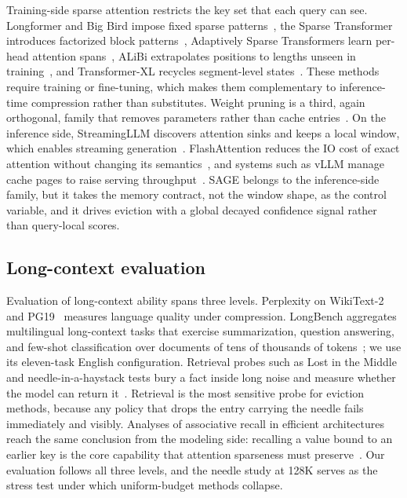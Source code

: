 Training-side sparse attention restricts the key set that each query
can see. Longformer and Big Bird impose fixed sparse
patterns~\cite{beltagy2020longformer,zaheer2020big}, the Sparse
Transformer introduces factorized block patterns~\cite{child2019generating},
Adaptively Sparse Transformers learn per-head attention
spans~\cite{correia2019adaptively}, ALiBi extrapolates positions to
lengths unseen in training~\cite{press2021alibi}, and Transformer-XL
recycles segment-level states~\cite{dai2019transformer}. These methods
require training or fine-tuning, which makes them complementary to
inference-time compression rather than substitutes. Weight pruning is
a third, again orthogonal, family that removes parameters rather than
cache entries~\cite{frantar2023sparsegpt}. On the inference
side, StreamingLLM discovers attention sinks and keeps a local window,
which enables streaming generation~\cite{xiao2023efficient}. FlashAttention
reduces the IO cost of exact attention without changing its
semantics~\cite{dao2022flashattention,dao2023flashattention2}, and
systems such as vLLM manage cache pages to raise serving
throughput~\cite{kwon2023vllm}. SAGE belongs to the inference-side
family, but it takes the memory contract, not the window shape, as the
control variable, and it drives eviction with a global decayed
confidence signal rather than query-local scores.

\subsection{Long-context evaluation}

Evaluation of long-context ability spans three levels. Perplexity on
WikiText-2~\cite{merity2016pointer} and PG19~\cite{rae2019compressive}
measures language quality under compression. LongBench aggregates
multilingual long-context tasks that exercise summarization, question
answering, and few-shot classification over documents of tens of
thousands of tokens~\cite{bai2023longbench}; we use its eleven-task
English configuration. Retrieval probes such as Lost in the
Middle and needle-in-a-haystack tests bury a fact inside long noise
and measure whether the model can return
it~\cite{liu2023lost}. Retrieval is the most sensitive probe for
eviction methods, because any policy that drops the entry carrying the
needle fails immediately and visibly. Analyses of associative recall
in efficient architectures reach the same conclusion from the modeling
side: recalling a value bound to an earlier key is the core capability
that attention sparseness must preserve~\cite{su2024zoology}. Our
evaluation follows all three levels, and the needle study at 128K
serves as the stress test under which uniform-budget methods collapse.

